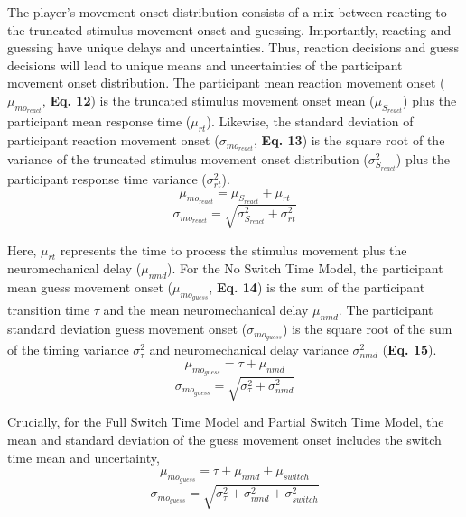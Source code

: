 \documentclass[12pt]{article}
\newcommand\boldblue[1]{\textcolor{mydarkblue}{\textbf{#1}}}
\begin{document}
The player’s movement onset distribution consists of a mix between reacting to the truncated stimulus movement onset and guessing. Importantly, reacting and guessing have unique delays and uncertainties. Thus, reaction decisions and guess decisions will lead to unique means and uncertainties of the participant movement onset distribution.
The participant mean reaction movement onset ($\mu_{mo_{react}}$, \boldblue{Eq. 12}) is the truncated stimulus movement onset mean ($\mu_{S_{react}}$) plus the participant mean response time ($\mu_{rt}$). Likewise, the standard deviation of participant reaction movement onset ($\sigma_{mo_{react}}$, \boldblue{Eq. 13}) is the square root of the variance of the truncated stimulus movement onset distribution ($\sigma_{S_{react}}^2$) plus the participant response time variance ($\sigma_{rt}^2$).
\begin{equation}
    \mu_{mo_{react}} = \mu_{S_{react}} + \mu_{rt}
\end{equation}
\begin{equation}
    \sigma_{mo_{react}} = \sqrt{\sigma_{S_{react}}^2 + \sigma_{rt}^2}
\end{equation}

Here, $\mu_{rt}$ represents the time to process the stimulus movement plus the neuromechanical delay ($\mu_{nmd}$).
For the No Switch Time Model, the participant mean guess movement onset ($\mu_{mo_{guess}}$, \boldblue{Eq. 14}) is the sum of the participant transition time $\tau$ and the mean neuromechanical delay $\mu_{nmd}$. The participant standard deviation guess movement onset ($\sigma_{mo_{guess}}$) is the square root of the sum of the timing variance $\sigma_{\tau}^2$ and neuromechanical delay variance $\sigma_{nmd}^2$ (\boldblue{Eq. 15}).
%
\begin{equation}
    \mu_{mo_{guess}} = \tau +  \mu_{nmd}
\end{equation}
\begin{equation}
    \sigma_{mo_{guess}} = \sqrt{\sigma_{\tau}^2 + \sigma_{nmd}^2}
\end{equation}

Crucially, for the Full Switch Time Model and Partial Switch Time Model, the mean and standard deviation of the guess movement onset includes the switch time mean and uncertainty,
\begin{equation}
    \mu_{mo_{guess}} = \tau +  \mu_{nmd} + \mu_{switch}
\end{equation}
\begin{equation}
    \sigma_{mo_{guess}} = \sqrt{\sigma_{\tau}^2 + \sigma_{nmd}^2 + \sigma_{switch}^2}
\end{equation}
\end{document}
